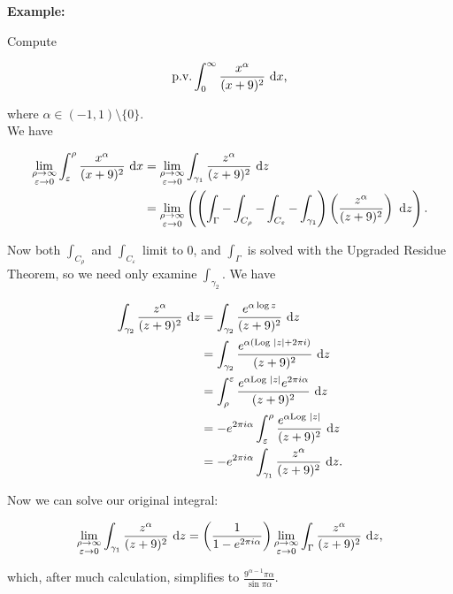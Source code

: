 \documentclass{article}
\theoremstyle{colontheorem}
\newcommand{\Log}{\textnormal{Log }}
\newcommand{\pv}{\textnormal{p.v.}}
\newenvironment{Example}
{
	\begin{mdframed}
	\textbf{Example:}%
}
{
	\end{mdframed}
	
	\vspace{.15in}
}
\begin{document}
\begin{Example}
	Compute
	
	$$
		\pv \int_0^\infty \frac{x^\alpha}{(x + 9)^2}\ \textnormal{d}x\textnormal{,}
	$$
	
	where $\alpha \in (-1, 1) \setminus \{0\}$.\\
	
	We have
	
	\begin{align*}
		\lim_{\substack{\rho \to \infty \\ \varepsilon \to 0}} \int_\varepsilon^\rho \frac{x^\alpha}{(x + 9)^2}\ \textnormal{d}x &= \lim_{\substack{\rho \to \infty \\ \varepsilon \to 0}} \int_{\gamma_1} \frac{z^\alpha}{(z + 9)^2}\ \textnormal{d}z\\
		&= \lim_{\substack{\rho \to \infty \\ \varepsilon \to 0}} \left( \left( \int_{\Gamma} - \int_{C_\rho} - \int_{C_\varepsilon} - \int_{\gamma_1} \right) \left( \frac{z^\alpha}{(z + 9)^2} \right)\ \textnormal{d}z \right).
	\end{align*}
	
	Now both $\int_{C_\rho}$ and $\int_{C_\varepsilon}$ limit to $0$, and $\int_{\Gamma}$ is solved with the Upgraded Residue Theorem, so we need only examine $\int_{\gamma_2}$. We have
	
	\begin{align*}
		\int_{\gamma_2} \frac{z^\alpha}{(z + 9)^2}\ \textnormal{d}z &= \int_{\gamma_2} \frac{e^{\alpha \log z}}{(z + 9)^2}\ \textnormal{d}z\\
		&= \int_{\gamma_2} \frac{e^{\alpha (\Log |z| + 2 \pi i)}}{(z + 9)^2}\ \textnormal{d}z\\
		&= \int_\rho^\varepsilon \frac{e^{\alpha \Log |z|} e^{2 \pi i \alpha}}{(z + 9)^2}\ \textnormal{d}z\\
		&= -e^{2 \pi i \alpha} \int_\varepsilon^\rho \frac{e^{\alpha \Log |z|}}{(z + 9)^2}\ \textnormal{d}z\\
		&= -e^{2 \pi i \alpha} \int_{\gamma_1} \frac{z^\alpha}{(z + 9)^2}\ \textnormal{d}z.
	\end{align*}
	
	Now we can solve our original integral:
	
	$$
		\lim_{\substack{\rho \to \infty \\ \varepsilon \to 0}} \int_{\gamma_1} \frac{z^\alpha}{(z + 9)^2}\ \textnormal{d}z = \left( \frac{1}{1 - e^{2 \pi i \alpha}} \right) \lim_{\substack{\rho \to \infty \\ \varepsilon \to 0}} \int_\Gamma \frac{z^\alpha}{(z + 9)^2}\ \textnormal{d}z\textnormal{,}
	$$
	
	which, after much calculation, simplifies to $\frac{9^{\alpha - 1} \pi \alpha}{\sin \pi \alpha}$.
	
\end{Example}
\end{document}
